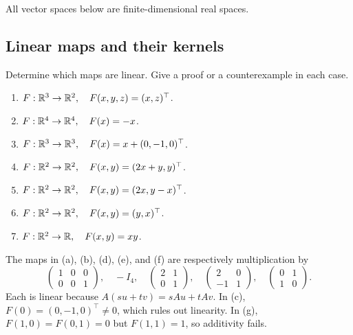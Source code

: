 All vector spaces below are finite-dimensional real spaces.

\subsection*{Linear maps and their kernels}

\begin{problem}\label{ex:04:linearity}
Determine which maps are linear. Give a proof or a counterexample in each case.
\begin{enumerate}
\item \(F:\mathbb R^3\to\mathbb R^2,\quad F(x,y,z)=(x,z)^\top\).
\item \(F:\mathbb R^4\to\mathbb R^4,\quad F(x)=-x\).
\item \(F:\mathbb R^3\to\mathbb R^3,\quad F(x)=x+(0,-1,0)^\top\).
\item \(F:\mathbb R^2\to\mathbb R^2,\quad F(x,y)=(2x+y,y)^\top\).
\item \(F:\mathbb R^2\to\mathbb R^2,\quad F(x,y)=(2x,y-x)^\top\).
\item \(F:\mathbb R^2\to\mathbb R^2,\quad F(x,y)=(y,x)^\top\).
\item \(F:\mathbb R^2\to\mathbb R,\quad F(x,y)=xy\).
\end{enumerate}
\end{problem}
\begin{solution}
The maps in (a), (b), (d), (e), and (f) are respectively multiplication by
\[
\begin{pmatrix}1&0&0\\0&0&1\end{pmatrix},\quad
-I_4,\quad
\begin{pmatrix}2&1\\0&1\end{pmatrix},\quad
\begin{pmatrix}2&0\\-1&1\end{pmatrix},\quad
\begin{pmatrix}0&1\\1&0\end{pmatrix}.
\]
Each is linear because \(A(su+tv)=sAu+tAv\).
In (c), \(F(0)=(0,-1,0)^\top\ne0\), which rules out linearity.
In (g), \(F(1,0)=F(0,1)=0\) but \(F(1,1)=1\), so additivity fails.
\end{solution}


